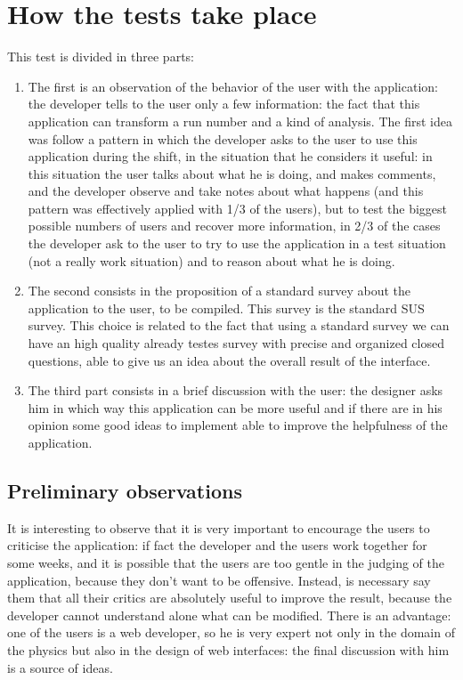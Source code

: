 \section{How the tests take place} 


This test is divided in three parts: 
\begin{enumerate}
\item
The first is an observation of the behavior of the user with the application: the developer tells to the user only a few information: the fact that this application can transform a run number and a kind of analysis. 
The first idea was follow a pattern in which the developer asks to the user to use this application during the shift, in the situation that he considers it useful: in this situation the user talks about what he is doing, and makes comments, and the developer observe and take notes about what happens (and this pattern was effectively applied with 1/3 of the users), but to test the biggest possible numbers of users and recover more information, in 2/3 of the cases the developer ask to the user to try to use the application in a test situation (not a really work situation) and to reason about what he is doing.
\item
The second consists in the proposition of a standard survey about the application to the user, to be compiled. This survey is the standard SUS survey. This choice is related to the fact that using a standard survey we can have an high quality already testes survey with precise and organized closed questions, able to give us an idea about the overall result of the interface. 
\item 
The third part consists in a brief discussion with the user: the designer asks him in which way this application can be more useful and if there are in his opinion some good ideas to implement able to improve the helpfulness of the application.

\end{enumerate} 

\subsection{Preliminary observations}
It is interesting to observe that it is very important to encourage the users to criticise the application: if fact the developer and the users work together for some weeks, and it is possible that the users are too gentle in the judging of the application, because they don't want to be offensive. Instead, is necessary say them that all their critics are absolutely useful to improve the result, because the developer cannot understand alone what can be modified. 
There is an advantage: one of the users is a web developer, so he is very expert not only in the domain of the physics but also in the design of web interfaces: the final discussion with him is a source of ideas.  

